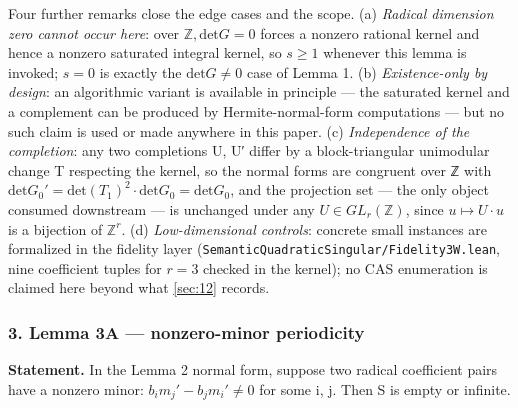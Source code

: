 Four further remarks close the edge cases and the scope. (a) \emph{Radical dimension zero cannot occur here}: over $ℤ, \mathrm{det} G = 0$ forces a nonzero rational kernel and hence a nonzero saturated integral kernel, so $s ≥ 1$ whenever this lemma is invoked; $s = 0$ is exactly the $\mathrm{det} G ≠ 0$ case of Lemma 1. (b) \emph{Existence-only by design}: an algorithmic variant is available in principle — the saturated kernel and a complement can be produced by Hermite-normal-form computations — but no such claim is used or made anywhere in this paper. (c) \emph{Independence of the completion}: any two completions U, U′ differ by a block-triangular unimodular change T respecting the kernel, so the normal forms are congruent over ℤ with $\mathrm{det} G_{0}′ = \mathrm{det}(T_{1})^{2}·\mathrm{det} G_{0} = \mathrm{det} G_{0}$, and the projection set — the only object consumed downstream — is unchanged under any $U ∈ GL_{r}(ℤ)$, since $u ↦ U·u$ is a bijection of $ℤ^{r}$. (d) \emph{Low-dimensional controls}: concrete small instances are formalized in the fidelity layer (\texttt{SemanticQuadraticSingular/Fidelity3W.\allowbreak{}lean}, nine coefficient tuples for $r = 3$ checked in the kernel); no CAS enumeration is claimed here beyond what \cref{sec:12} records.

\subsubsection*{3. Lemma 3A — nonzero-minor periodicity}
\textbf{Statement.} In the Lemma 2 normal form, suppose two radical coefficient pairs have a nonzero minor: $b_{i}m_{j}′ − b_{j}m_{i}′ ≠ 0$ for some i, j. Then S is empty or infinite.

